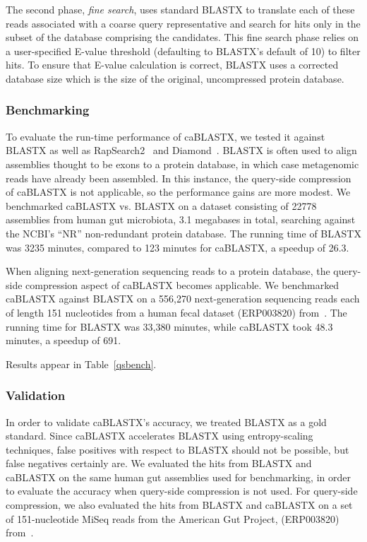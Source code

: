 \documentclass[review,preprint,12pt]{elsarticle}
\theoremstyle{definition}
\theoremstyle{remark}
\numberwithin{equation}{section}
\begin{document}
The second phase, \emph{fine search}, uses standard BLASTX to translate each
of these reads associated with a coarse query representative and search for
hits only in the subset of the database comprising the candidates.
This fine search phase relies on a user-specified E-value threshold (defaulting
to BLASTX's default of 10) to filter hits.
To ensure that E-value calculation is correct, BLASTX uses a corrected database
size which is the size of the original, uncompressed protein database.

\subsubsection*{Benchmarking}

To evaluate the run-time performance of caBLASTX, we tested it against
BLASTX as well as RapSearch2~\cite{rs2} and Diamond~\cite{diamond}.
BLASTX is often used to align assemblies thought to be exons to a protein
database, in which case metagenomic reads have already been assembled.
In this instance, the query-side compression of caBLASTX is not applicable, so
the performance gains are more modest.
We benchmarked caBLASTX vs. BLASTX on a dataset consisting of 22778 assemblies
from human gut microbiota, 3.1 megabases in total, searching against the NCBI's
``NR'' non-redundant protein database.
The running time of BLASTX was 3235 minutes, compared to 123 minutes for caBLASTX, a speedup of 26.3.

When aligning next-generation sequencing reads to a protein database, the
query-side compression aspect of caBLASTX becomes applicable.
We benchmarked caBLASTX against BLASTX on a 556,270
next-generation sequencing reads each of length 151 nucleotides from a human 
fecal dataset (ERP003820) from~\cite{blah}.
The running time for BLASTX was 33,380 minutes, while caBLASTX took 48.3 
minutes, a speedup of 691.
 
Results appear in Table~\ref{qsbench}.




\subsubsection*{Validation}

In order to validate caBLASTX's accuracy, we treated BLASTX as a gold standard. 
Since caBLASTX accelerates BLASTX
using entropy-scaling techniques, false positives with respect to BLASTX should 
not be possible, but false negatives certainly are.
We evaluated the hits from BLASTX and caBLASTX on the same human gut
assemblies used for benchmarking, in order to evaluate the accuracy when
query-side compression is not used.
For query-side compression, we also evaluated the hits from BLASTX and caBLASTX
on a set of 151-nucleotide MiSeq reads from the American Gut Project,
(ERP003820) from~\cite{blah}.
\end{document}
